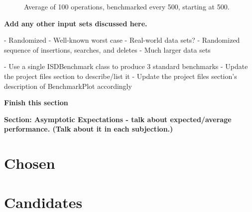 \documentclass{article}
\newcommand {\todo}[1] {{\textbf{\color{red}#1}}}
\begin{document}
\begin{figure}[h]
    \centering
    
    
    
    \caption{Average of 100 operations, benchmarked every 500, starting at 500.}
\end{figure}

\todo{Add any other input sets discussed here.}


- Randomized
- Well-known worst case
- Real-world data sets?
- Randomized sequence of insertions, searches, and deletes
- Much larger data sets

- Use a single ISDBenchmark class to produce 3 standard benchmarks
- Update the project files section to describe/list it
- Update the project files section's description of BenchmarkPlot accordingly

\todo{Finish this section}

\todo{Section: Asymptotic Expectations - talk about expected/average performance. (Talk about it in each subjection.)}
\newpage

\section{Chosen}



\section{Candidates}
% 
% 
% 
% 
% 
% 
% 
% 
% 
% 
\end{document}
